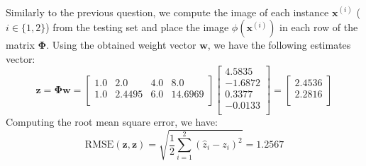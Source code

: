 \documentclass{exam}
\begin{document}
\begin{questions}
\begin{align*}
        \end{align*}
        \item Similarly to the previous question, we compute the image of each instance $\textbf{x}^{(i)}$ ($i \in \{1,2\}$) from the testing set and place the image $\phi(\textbf{x}^{(i)})$ in each row of the matrix $\boldsymbol{\Phi}$. Using the obtained weight vector $\textbf{w}$, we have the following estimates vector:
        \begin{equation*}
            \textbf{\^{z}} = \boldsymbol{\Phi}\textbf{w} = 
            \begin{bmatrix}
                1.0 & 2.0 & 4.0 & 8.0 \\
                1.0 & 2.4495 & 6.0 & 14.6969 \\
            \end{bmatrix}
            \begin{bmatrix}
                4.5835 \\
                -1.6872 \\
                0.3377 \\ 
                -0.0133 \\
            \end{bmatrix} = 
            \begin{bmatrix}
                2.4536 \\
                2.2816 \\
            \end{bmatrix}
        \end{equation*}
        Computing the root mean square error, we have:
        \begin{equation*}
           \mathrm{RMSE}(\textbf{\^{z}}, \textbf{z}) = \sqrt{\frac{1}{2}\sum_{i = 1}^{2}(\hat{z}_i - z_i)^2} = 1.2567
        \end{equation*}
        

\end{questions}
\end{document}
